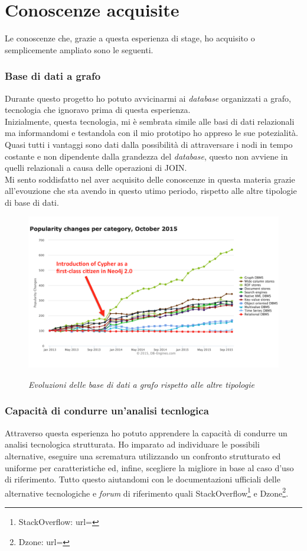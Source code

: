 \section{Conoscenze acquisite}
Le conoscenze che, grazie a questa esperienza di stage, ho acquisito o semplicemente ampliato sono le seguenti.
\subsubsection{Base di dati a grafo}
Durante questo progetto ho potuto avvicinarmi ai \textit{database} organizzati a grafo, tecnologia che ignoravo prima di questa esperienza.\\
Inizialmente, questa tecnologia, mi è sembrata simile alle basi di dati relazionali ma informandomi e testandola con il mio prototipo ho appreso le sue potezialità. Quasi tutti i vantaggi sono dati dalla possibilità di attraversare i nodi in tempo costante e non dipendente dalla grandezza del \textit{database}, questo non avviene in quelli relazionali a causa delle operazioni di JOIN\glsfirstoccur.\\
Mi sento soddisfatto nel aver acquisito delle conoscenze in questa materia grazie all'evouzione che sta avendo in questo utimo periodo, rispetto alle altre tipologie di base di dati.
\begin{figure}[h!]
	\centering
	\includegraphics[scale=0.4]{immagini/graphchange.png}
	\label{fig:figura 2.2}
	\caption{\textit{Evoluzioni delle base di dati a grafo rispetto alle altre tipologie \\}}
\end{figure}
\newpage
\subsubsection{Capacità di condurre un'analisi tecnlogica}
Attraverso questa esperienza ho potuto apprendere la capacità di condurre un analisi tecnologica strutturata. Ho imparato ad individuare le possibili alternative, eseguire una scrematura utilizzando un confronto strutturato ed uniforme per caratteristiche ed, infine, scegliere la migliore in base al caso d'uso di riferimento. Tutto questo aiutandomi con le documentazioni ufficiali delle alternative tecnologiche e \textit{forum} di riferimento quali StackOverflow\footnote{StackOverflow: url= } e Dzone\footnote{Dzone: url= }.
